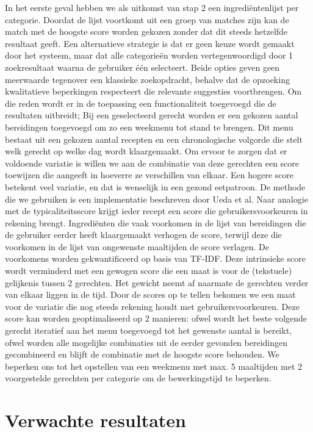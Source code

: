\documentclass{hogent-article}
\begin{document}
In het eerste geval hebben we als uitkomst van stap 2 een ingrediëntenlijst per categorie. Doordat de lijst voortkomt uit een groep van matches zijn kan de match met de hoogste score worden gekozen zonder dat dit steeds hetzelfde resultaat geeft. Een alternatieve strategie is dat er geen keuze wordt gemaakt door het systeem, maar dat alle categorieën worden vertegenwoordigd door 1 zoekresultaat waarna de gebruiker één selecteert.
Beide opties geven geen meerwaarde tegenover een klassieke zoekopdracht, behalve dat de opzoeking kwalitatieve beperkingen respecteert die relevante suggesties voortbrengen. Om die reden wordt er in de toepassing een functionaliteit toegevoegd die de resultaten uitbreidt; Bij een geselecteerd gerecht worden er een gekozen aantal bereidingen toegevoegd om zo een weekmenu tot stand te brengen. Dit menu bestaat uit een gekozen aantal recepten en een chronologische volgorde die stelt welk gerecht op welke dag wordt klaargemaakt. Om ervoor te zorgen dat er voldoende variatie is willen we aan de combinatie van deze gerechten een score toewijzen die aangeeft in hoeverre ze verschillen van elkaar. Een hogere score betekent veel variatie, en dat is wenselijk in een gezond eetpatroon. De methode die we gebruiken is een implementatie beschreven door Ueda et al. Naar analogie met de typicaliteitsscore krijgt ieder recept een score die gebruikersvoorkeuren in rekening brengt. Ingrediënten die vaak voorkomen in de lijst van bereidingen die de gebruiker eerder heeft klaargemaakt verhogen de score, terwijl deze die voorkomen in de lijst van ongewenste maaltijden de score verlagen. De voorkomens worden gekwantificeerd op basis van TF-IDF. Deze intrinsieke score wordt verminderd met een gewogen score die een maat is voor de (tekstuele) gelijkenis tussen 2 gerechten. Het gewicht neemt af naarmate de gerechten verder van elkaar liggen in de tijd.
Door de scores op te tellen bekomen we een maat voor de variatie die nog steeds rekening houdt met gebruikersvoorkeuren. Deze score kan worden geoptimaliseerd op 2 manieren: ofwel wordt het beste volgende gerecht iteratief aan het menu toegevoegd tot het gewenste aantal is bereikt, ofwel worden alle mogelijke combinaties uit de eerder gevonden bereidingen gecombineerd en blijft de combinatie met de hoogste score behouden. We beperken ons tot het opstellen van een weekmenu met max. 5 maaltijden met 2 voorgestelde gerechten per categorie om de bewerkingstijd te beperken.

\section{Verwachte resultaten}%
\label{sec:verwachte-resultaten}
\end{document}
